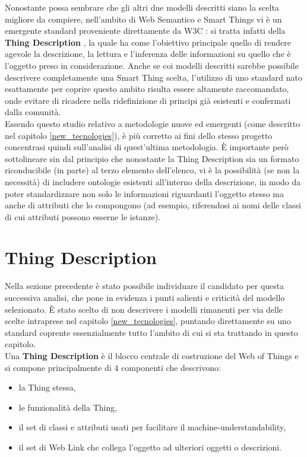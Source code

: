 \documentclass[12pt,a4paper,openright,oneside]{report}
\begin{document}
Nonostante possa sembrare che gli altri due modelli descritti siano la scelta migliore da compiere, nell'ambito di Web Semantico e Smart Things vi è un emergente standard proveniente direttamente da W3C \cite{w3c}: si tratta infatti della \textbf{Thing Description} \cite{td}, la quale ha come l'obiettivo principale quello di rendere agevole la descrizione, la lettura e l'inferenza delle informazioni su quello che è l'oggetto preso in considerazione. Anche se coi modelli descritti sarebbe possibile descrivere completamente una Smart Thing scelta, l'utilizzo di uno standard nato esattamente per coprire questo ambito risulta essere altamente raccomandato, onde evitare di ricadere nella ridefinizione di principi già esistenti e confermati dalla comunità.\\

Essendo questo studio relativo a metodologie nuove ed emergenti (come descritto nel capitolo \ref{new_tecnologies}), è più corretto ai fini dello stesso progetto concentrasi quindi sull'analisi di quest'ultima metodologia. È importante però sottolineare sin dal principio che nonostante la Thing Description sia un formato riconducibile (in parte) al terzo elemento dell'elenco, vi è la possibilità (se non la necessità) di includere ontologie esistenti all'interno della descrizione, in modo da poter standardizzare non solo le informazioni riguardanti l'oggetto stesso ma anche di attributi che lo compongono (ad esempio, riferendosi ai nomi delle classi di cui attributi possono esserne le istanze).\\

\section{Thing Description}
\label{sec:thing_description}
Nella sezione precedente è stato possibile individuare il candidato per questa successiva analisi, che pone in evidenza i punti salienti e criticità del modello selezionato. È stato scelto di non descrivere i modelli rimanenti per via delle scelte intraprese nel capitolo \ref{new_tecnologies}, puntando direttamente su uno standard coprente essenzialmente tutto l'ambito di cui si sta trattando in questo capitolo.\\

Una \textbf{Thing Description} \cite{td} è il blocco centrale di costruzione del Web of Things e si compone principalmente di 4 componenti che descrivono: 
\begin{itemize}
	\setlength\itemsep{-0.7em}
	\item la Thing stessa,
	\item le funzionalità della Thing,
	\item il set di classi e attributi usati per facilitare il machine-understandability,
	\item il set di Web Link che collega l'oggetto ad ulteriori oggetti o descrizioni.
\end{itemize}
\end{document}
